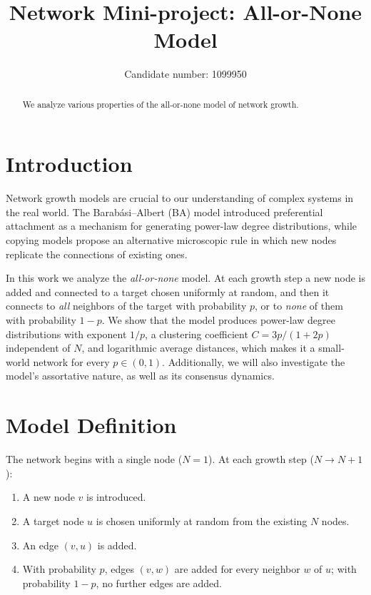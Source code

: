 \documentclass[aps,pre,twocolumn,showpacs,preprintnumbers]{revtex4-2}
\begin{document}
\title{Network Mini-project: All-or-None Model}

\author{Candidate number: 1099950}

\begin{abstract}
  We analyze various properties of the all-or-none model of network growth.
\end{abstract}

\maketitle

\section{\label{sec:intro}Introduction}

Network growth models are crucial to our understanding of complex systems in the real world. The Barab\'asi--Albert (BA) model introduced preferential attachment as a mechanism for generating power-law degree distributions, while copying models propose an alternative microscopic rule in which new nodes replicate the connections of existing ones.

In this work we analyze the \emph{all-or-none} model. At each growth step a new node is added and connected to a target chosen uniformly at random, and then it connects to \emph{all} neighbors of the target with probability $p$, or to \emph{none} of them with probability $1-p$. We show that the model produces power-law degree distributions with exponent $1/p$, a clustering coefficient $C=3p/(1+2p)$ independent of $N$, and logarithmic average distances, which makes it a small-world network for every $p\in(0,1)$. Additionally, we will also investigate the model's assortative nature, as well as its consensus dynamics.

\section{\label{sec:model}Model Definition}

The network begins with a single node ($N=1$). At each growth step ($N\to N+1$):
\begin{enumerate}
  \item A new node $v$ is introduced.
  \item A target node $u$ is chosen uniformly at random from the existing $N$ nodes.
  \item An edge $(v, u)$ is added.
  \item With probability $p$, edges $(v, w)$ are added for every neighbor $w$ of $u$; with probability $1-p$, no further edges are added.
\end{enumerate}
\end{document}
